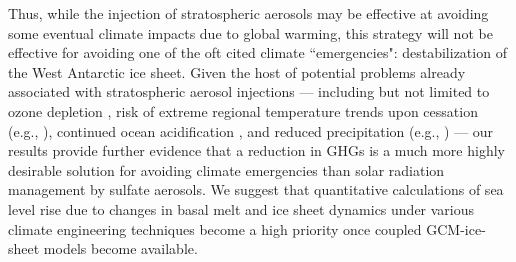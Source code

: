 \documentclass{nature}
\begin{document}
Thus, while the injection of stratospheric aerosols may be effective at avoiding some eventual climate impacts due to global warming, this strategy will not be effective for avoiding one of the oft cited climate ``emergencies": destabilization of the West Antarctic ice sheet. Given the host of potential problems already associated with stratospheric aerosol injections --- including but not limited to ozone depletion \cite{tilmes08,heckendorn09}, risk of extreme regional temperature trends upon cessation (e.g., \cite{mccusker14}), continued ocean acidification \cite{feely04}, and reduced precipitation (e.g., \cite{bala08}) --- our results provide further evidence that a reduction in GHGs is a much more highly desirable solution for avoiding climate emergencies than solar radiation management by sulfate aerosols. We suggest that quantitative calculations of sea level rise due to changes in basal melt and ice sheet dynamics under various climate engineering techniques become a high priority once coupled GCM-ice-sheet models become available.
\end{document}
